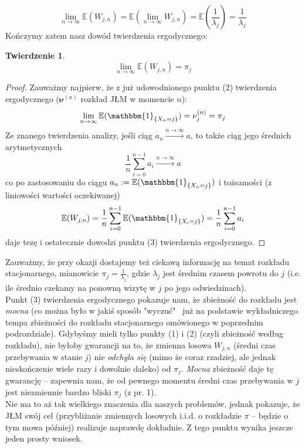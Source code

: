 \documentclass[a4paper]{article}
\theoremstyle{defn}
\theoremstyle{theorem}
\newtheorem{theorem}[defn]{Twierdzenie}
\theoremstyle{lemma}
\theoremstyle{cor}
\theoremstyle{fact}
\begin{document}
$$\lim\limits_{n \to \infty} \mathbb{E}(W_{j,n}) = \mathbb{E}\left( \lim\limits_{n \to \infty} W_{j,n}\right) = \mathbb{E}\left(\frac{1}{\lambda_j}\right) = \frac{1}{\lambda_j}$$
Kończymy zatem nasz dowód twierdzenia ergodycznego:
\begin{theorem}\label{theorem2.5.13}
$$\lim\limits_{n \to \infty} \mathbb{E}(W_{j,n}) = \pi_j$$
\end{theorem}
\begin{proof}
Zauważmy najpierw, że z już udowodnionego punktu (2) twierdzenia ergodycznego ($\boldsymbol{\nu}^{(n)}$ rozkład JŁM w momencie $n$):
$$\lim\limits_{n \to \infty} \mathbb{E}(\mathbbm{1}_{\{X_n = j\}}) = \nu^{(n)}_j = \pi_j$$
Ze znanego twierdzenia analizy, jeśli ciąg $a_n \xrightarrow{n \to \infty} a$, to także ciąg jego średnich arytmetycznych $$\frac{1}{n}\sum_{i=0}^{n-1} a_i \xrightarrow{n \to \infty} a$$
co po zastosowaniu do ciągu $a_n := \mathbb{E}(\mathbbm{1}_{\{X_n = j\}})$ i tożsamości (z liniowości wartości oczekiwanej)
$$\mathbb{E}(W_{j,n}) = \frac{1}{n} \sum\limits_{i=0}^{n-1} \mathbb{E}(\mathbbm{1}_{\{X_i = j\}}) = \frac{1}{n} \sum\limits_{i=0}^{n-1} a_i$$
daje tezę i ostatecznie dowodzi punktu (3) twierdzenia ergodycznego.
\end{proof}
Zauważmy, że przy okazji dostajemy też ciekawą informację na temat rozkładu stacjonarnego, mianowicie $\pi_j = \frac{1}{\lambda_j}$, gdzie $\lambda_j$ jest średnim czasem powrotu do $j$ (i.e. ile średnio czekamy na ponowną wizytę w $j$ po jego odwiedzinach).
\\

Punkt (3) twierdzenia ergodycznego pokazuje nam, że zbieżność do rozkładu jest \textit{mocna} (co można było w jakiś sposób "wyczuć" \, już na podstawie wykładniczego tempa zbieżności do rozkładu stacjonarnego omówionego w poprzednim podrozdziale). Gdybyśmy mieli tylko punkty (1) i (2) (czyli zbieżność według rozkładu), nie byłoby gwarancji na to, że zmienna losowa $W_{j,n}$ (średni czas przebywania w stanie $j$) nie \textit{odchyla się} (mimo że coraz rzadziej, ale jednak nieskończenie wiele razy i dowolnie daleko) od $\pi_j$. \textit{Mocna} zbieżność daje tę gwarancję – zapewnia nam, że od pewnego momentu średni czas przebywania w $j$ jest niezmiennie bardzo bliski $\pi_j$ (z pr. 1).\\
Nie ma to aż tak wielkiego znaczenia dla naszych problemów, jednak pokazuje, że JŁM swój cel (przybliżanie zmiennych losowych i.i.d. o rozkładzie $\pi$ – będzie o tym mowa później) realizuje naprawdę dokładnie. Z tego punktu wynika jeszcze jeden prosty wniosek.
\\
\end{document}
